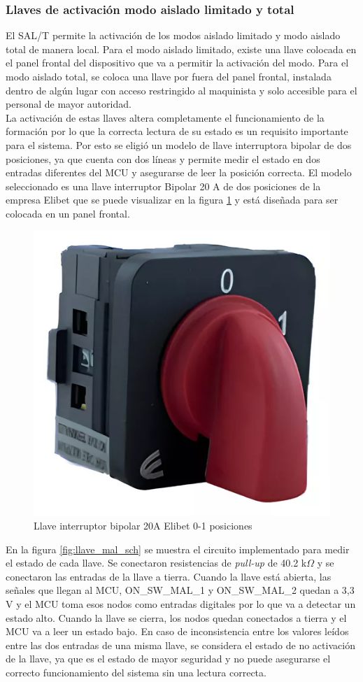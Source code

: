 \subsubsection{Llaves de activación modo aislado limitado y total}

El SAL/T permite la activación de los modos aislado limitado y modo aislado total de manera local. Para el modo aislado limitado, existe una llave colocada en el panel frontal del dispositivo que va a permitir la activación del modo. Para el modo aislado total, se coloca una llave por fuera del panel frontal, instalada dentro de algún lugar con acceso restringido al maquinista y solo accesible para el personal de mayor autoridad.  \\

La activación de estas llaves altera completamente el funcionamiento de la formación por lo que la correcta lectura de su estado es un requisito importante para el sistema. Por esto se eligió un modelo de llave interruptora bipolar de dos posiciones, ya que cuenta con dos líneas y permite medir el estado en dos entradas diferentes del MCU y asegurarse de leer la posición correcta. El modelo seleccionado es una llave interruptor Bipolar 20 A de dos posiciones de la empresa Elibet \cite{llave_elibet} que se puede visualizar en la figura \ref{fig:llave_mal} y está diseñada para ser colocada en un panel frontal. 

\begin{figure}[H]
    \centering
    \includegraphics[width = 0.4\linewidth]{img/llave_mal.png}
    \caption{Llave interruptor bipolar 20A Elibet 0-1 posiciones}
    \label{fig:llave_mal}
\end{figure}

En la figura \ref{fig:llave_mal_sch} se muestra el circuito implementado para medir el estado de cada llave. Se conectaron resistencias de \textit{pull-up} de 40.2 k$\Omega$ y se conectaron las entradas de la llave a tierra. Cuando la llave está abierta, las señales que llegan al MCU, ON\_SW\_MAL\_1 y ON\_SW\_MAL\_2 quedan a 3,3 V y el MCU toma esos nodos como entradas digitales por lo que va a detectar un estado alto. Cuando la llave se cierra, los nodos quedan conectados a tierra y el MCU va a leer un estado bajo. En caso de inconsistencia entre los valores leídos entre las dos entradas de una misma llave, se considera el estado de no activación de la llave, ya que es el estado de mayor seguridad y no puede asegurarse el correcto funcionamiento del sistema sin una lectura correcta. 


